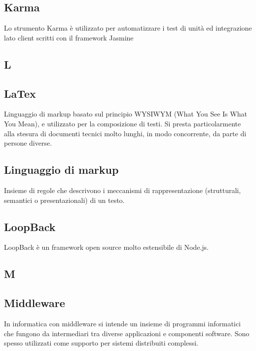 \subsection{Karma}
Lo strumento Karma è utilizzato per automatizzare i test di unità ed integrazione lato client scritti
con il framework Jasmine

\newpage

\begin{center}
\Huge\section{\uppercase{L}}
\end{center}

\subsection{LaTex}
Linguaggio di markup basato sul principio WYSIWYM (What You See Is What You
Mean), e utilizzato per la composizione di testi. Si presta particolarmente alla stesura di
documenti tecnici molto lunghi, in modo concorrente, da parte di persone diverse.

\subsection{Linguaggio di markup}
Insieme di regole che descrivono i meccanismi di rappresentazione (strutturali, semantici o presentazionali) di un testo.

\subsection{LoopBack}
LoopBack è un framework open source molto estensibile di Node.js. 

\newpage

\begin{center}
\Huge\section{\uppercase{M}}
\end{center}

\subsection{Middleware}
In informatica con middleware si intende un insieme di programmi informatici che fungono da intermediari tra diverse applicazioni e componenti software. Sono spesso utilizzati come supporto per sistemi distribuiti complessi.

